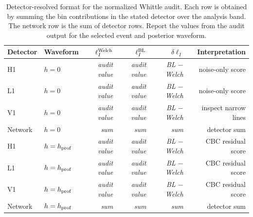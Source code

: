 \begin{table}[ht]
\centering
\small
\caption{Detector-resolved format for the normalized Whittle audit. Each row
is obtained by summing the bin contributions in the stated detector over the
analysis band. The network row is the sum of detector rows. Report the values
from the audit output for the selected event and posterior waveform.}
\begin{tabular}{llrrrr}
\toprule
\textbf{Detector} & \textbf{Waveform} & \textbf{$\ell_I^{\rm Welch}$}
& \textbf{$\ell_I^{\rm BL}$} & \textbf{$\delta\ell_I$}
& \textbf{Interpretation}\\
\midrule
H1 & $h=0$ & \textit{audit value} & \textit{audit value}
& \textit{BL $-$ Welch} & noise-only score\\
L1 & $h=0$ & \textit{audit value} & \textit{audit value}
& \textit{BL $-$ Welch} & noise-only score\\
V1 & $h=0$ & \textit{audit value} & \textit{audit value}
& \textit{BL $-$ Welch} & inspect narrow lines\\
Network & $h=0$ & \textit{sum} & \textit{sum}
& \textit{sum} & detector sum\\
\addlinespace
H1 & $h=h_{\rm prof}$ & \textit{audit value} & \textit{audit value}
& \textit{BL $-$ Welch} & CBC residual score\\
L1 & $h=h_{\rm prof}$ & \textit{audit value} & \textit{audit value}
& \textit{BL $-$ Welch} & CBC residual score\\
V1 & $h=h_{\rm prof}$ & \textit{audit value} & \textit{audit value}
& \textit{BL $-$ Welch} & CBC residual score\\
Network & $h=h_{\rm prof}$ & \textit{sum} & \textit{sum}
& \textit{sum} & detector sum\\
\bottomrule
\end{tabular}
\end{table}

